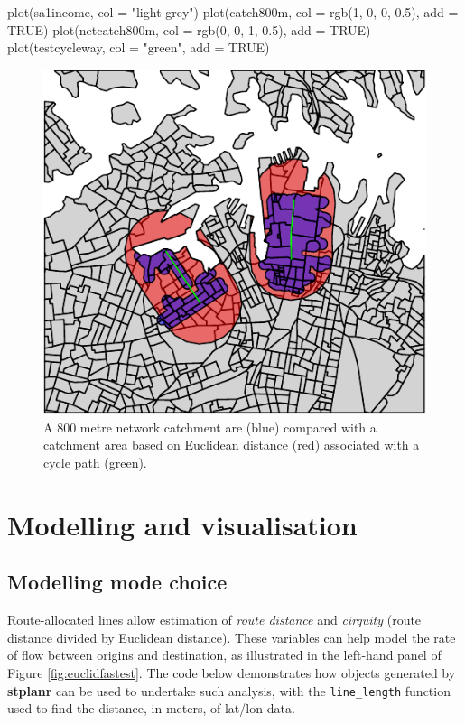 \begin{Schunk}
\begin{Sinput}
plot(sa1income, col = "light grey")
plot(catch800m, col = rgb(1, 0, 0, 0.5), add = TRUE)
plot(netcatch800m, col = rgb(0, 0, 1, 0.5), add = TRUE)
plot(testcycleway, col = "green", add = TRUE)
\end{Sinput}
\begin{figure}
\includegraphics{netcatchplot-1} \caption[A 800 metre network catchment are (blue) compared with a catchment area based on Euclidean distance (red) associated with a cycle path (green)]{A 800 metre network catchment are (blue) compared with a catchment area based on Euclidean distance (red) associated with a cycle path (green).}\label{fig:netcatchplot}
\end{figure}
\end{Schunk}

\section{Modelling and visualisation}\label{modelling-and-visualisation}

\subsection{Modelling mode choice}\label{modelling-mode-choice}

Route-allocated lines allow estimation of \emph{route distance} and
\emph{cirquity} (route distance divided by Euclidean distance). These
variables can help model the rate of flow between origins and
destination, as illustrated in the left-hand panel of Figure
\ref{fig:euclidfastest}. The code below demonstrates how objects
generated by \textbf{stplanr} can be used to undertake such analysis,
with the \texttt{line\_length} function used to find the distance, in
meters, of lat/lon data.

